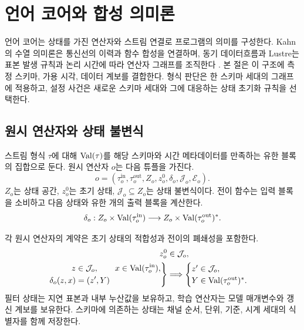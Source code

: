 \section{언어 코어와 합성 의미론}
\label{sec:semantics}

언어 코어는 상태를 가진 연산자와 스트림 연결로 프로그램의 의미를 구성한다.
Kahn의 수열 의미론은 통신선의 이력과 함수 합성을 연결하며,
동기 데이터흐름과 Lustre는 표본 발생 규칙과 논리 시간에 따라 연산자 그래프를 조직한다
\citep{kahn,sdf,lustre}.
본 절은 이 구조에 측정 스키마, 가용 시각, 데이터 계보를 결합한다.
형식 판단은 한 스키마 세대의 그래프에 적용하고, 설정 사건은 새로운 스키마 세대와
그에 대응하는 상태 초기화 규칙을 선택한다.

\subsection{원시 연산자와 상태 불변식}

\begin{definition}[상태 전이 연산자]
스트림 형식 $\tau$에 대해 $\operatorname{Val}(\tau)$를 해당 스키마와 시간 메타데이터를
만족하는 유한 블록의 집합으로 둔다. 원시 연산자 $o$는 다음 튜플을 가진다.
\begin{equation}
 o=(\tau_o^{\mathrm{in}},\tau_o^{\mathrm{out}},Z_o,z_o^0,
       \delta_o,\mathcal J_o,\mathcal E_o).
\end{equation}
$Z_o$는 상태 공간, $z_o^0$는 초기 상태,
$\mathcal J_o\subseteq Z_o$는 상태 불변식이다. 전이 함수는 입력 블록을 소비하고
다음 상태와 유한 개의 출력 블록을 계산한다.
\begin{equation}
 \delta_o:Z_o\times\operatorname{Val}(\tau_o^{\mathrm{in}})
 \longrightarrow Z_o\times\operatorname{Val}(\tau_o^{\mathrm{out}})^*.
\end{equation}
\end{definition}

각 원시 연산자의 계약은 초기 상태의 적합성과 전이의 폐쇄성을 포함한다.
\begin{align}
 z_o^0&\in\mathcal J_o,\label{eq:primitive-init}\\
 \left.
 \begin{aligned}
 z&\in\mathcal J_o,\qquad x\in\operatorname{Val}(\tau_o^{\mathrm{in}}),\\
 \delta_o(z,x)&=(z',Y)
 \end{aligned}\right\}
 &\Longrightarrow
 \begin{cases}
 z'\in\mathcal J_o,\\
 Y\in\operatorname{Val}(\tau_o^{\mathrm{out}})^*.
 \end{cases}
 \label{eq:primitive-preservation}
\end{align}
필터 상태는 지연 표본과 내부 누산값을 보유하고, 학습 연산자는 모델 매개변수와
갱신 계보를 보유한다. 스키마에 의존하는 상태는 채널 순서, 단위, 기준,
시계 세대의 식별자를 함께 저장한다.

